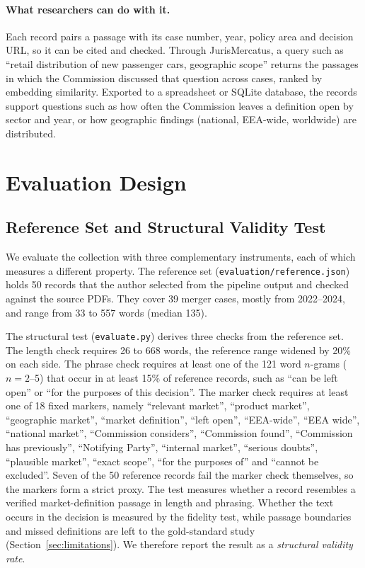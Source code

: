 \documentclass{IOS-Book-Article}
\begin{document}
\paragraph{What researchers can do with it.} Each record pairs a passage with
its case number, year, policy area and decision URL, so it can be cited and
checked. Through JurisMercatus, a query such as ``retail distribution of new
passenger cars, geographic scope'' returns the passages in which the Commission
discussed that question across cases, ranked by embedding similarity. Exported
to a spreadsheet or SQLite database, the records support questions such as how
often the Commission leaves a definition open by sector and year, or how
geographic findings (national, EEA-wide, worldwide) are distributed.

\section{Evaluation Design}
\label{sec:evaluation}

\subsection{Reference Set and Structural Validity Test}

We evaluate the collection with three complementary instruments, each of which
measures a different property. The reference set
(\texttt{evaluation/reference.json}) holds 50 records that the author selected
from the pipeline output and checked against the source PDFs. They cover 39
merger cases, mostly from 2022--2024, and range from 33 to 557 words (median
135).

The structural test (\texttt{evaluate.py}) derives three checks from the
reference set. The length check requires 26 to 668 words, the reference range
widened by 20\% on each side. The phrase check requires at least one of the 121
word $n$-grams ($n=2$--5) that occur in at least 15\% of reference records, such
as ``can be left open'' or ``for the purposes of this decision''. The marker
check requires at least one of 18 fixed markers, namely ``relevant market'',
``product market'', ``geographic market'', ``market definition'', ``left
open'', ``EEA-wide'', ``EEA wide'', ``national market'', ``Commission
considers'', ``Commission found'', ``Commission has previously'', ``Notifying
Party'', ``internal market'', ``serious doubts'', ``plausible market'', ``exact
scope'', ``for the purposes of'' and ``cannot be excluded''. Seven of the 50
reference records fail the marker check themselves, so the markers form a
strict proxy. The test measures whether a record resembles a verified
market-definition passage in length and phrasing. Whether the text occurs in
the decision is measured by the fidelity test, while passage boundaries and
missed definitions are left to the gold-standard study
(Section~\ref{sec:limitations}). We therefore report the result as a
\emph{structural validity rate}.
\end{document}
